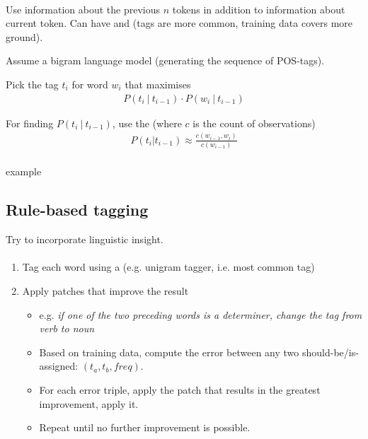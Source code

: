 \documentclass[10pt,twocolumn]{article}
\begin{document}
\paragraph{ } Use information about the previous $n$
tokens in addition to information about current token. Can have 
and  (tags are more common, training data covers more ground).

Assume a bigram language model (generating the sequence of POS-tags).

Pick the tag $t_i$ for word $w_i$ that maximises
\begin{align*}
  P(t_i ~|~ t_{i-1}) \cdot P(w_i~|~t_{i-1})
\end{align*}

For finding $P(t_i~|~t_{i-1})$, use the  (where
$c$ is the count of observations)
\begin{align*}
  P(t_i | t_{i-1}) \approx \frac{c(w_{i-1}, w_i)}{c(w_{i-1})}
\end{align*}


\paragraph{\textit{\todo}} example


\subsection{Rule-based tagging}

Try to incorporate linguistic insight.

\paragraph{ }
\begin{enumerate}
\item Tag each word using a  (e.g. unigram tagger, i.e.
  most common tag)
\item Apply patches that improve the result
  \begin{itemize}
  \item e.g. \textit{if one of the two preceding words is a determiner, change
      the tag from verb to noun}
  \item Based on training data, compute the error between any two
    should-be/is-assigned: $(t_a, t_b, \mathit{freq})$.
  \item For each error triple, apply the patch that results in the greatest
    improvement, apply it.
  \item Repeat until no further improvement is possible.
  \end{itemize}

\end{enumerate}
\end{document}
